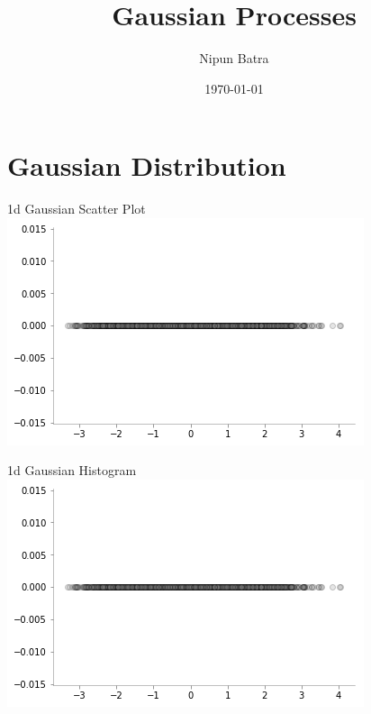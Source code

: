 \documentclass{beamer}
\title{Gaussian Processes}
\date{\today}
\author{Nipun Batra}
\institute{IIT Gandhinagar}
\begin{document}
  \maketitle
  
  
  
\section{Gaussian Distribution}
  \begin{frame}{1d Gaussian Scatter Plot}
    \includegraphics[width=\textwidth]{gp/1d-lineplot}
  \end{frame}

  \begin{frame}{1d Gaussian Histogram}
\includegraphics[width=\textwidth]{gp/1d-lineplot}
\end{frame}
\end{document}
